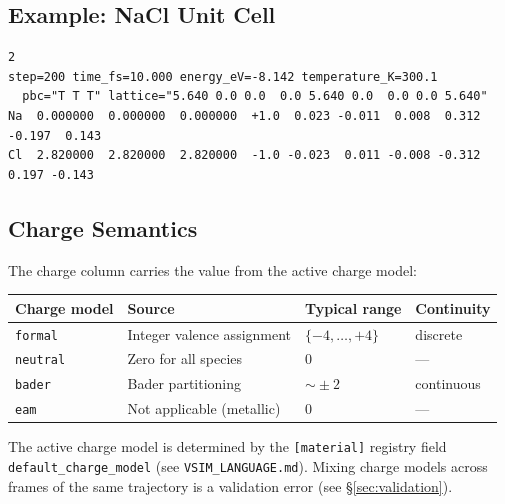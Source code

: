 \documentclass[11pt, a4paper, oneside]{article}
\begin{document}
\subsection{Example: NaCl Unit Cell}
\label{sec:xyza_example}

\begin{lstlisting}[caption={Two-ion NaCl unit at 300\,K (\texttt{.xyza}).}]
2
step=200 time_fs=10.000 energy_eV=-8.142 temperature_K=300.1
  pbc="T T T" lattice="5.640 0.0 0.0  0.0 5.640 0.0  0.0 0.0 5.640"
Na  0.000000  0.000000  0.000000  +1.0  0.023 -0.011  0.008  0.312 -0.197  0.143
Cl  2.820000  2.820000  2.820000  -1.0 -0.023  0.011 -0.008 -0.312  0.197 -0.143
\end{lstlisting}

\subsection{Charge Semantics}
\label{sec:xyza_charge}

The charge column carries the value from the active charge model:

\begin{center}
\begin{tabular}{llll}
  \toprule
  Charge model & Source & Typical range & Continuity \\
  \midrule
  \texttt{formal}  & Integer valence assignment     & $\{-4,\ldots,+4\}$ & discrete \\
  \texttt{neutral} & Zero for all species           & $0$                & --- \\
  \texttt{bader}   & Bader partitioning             & $\sim\!\pm 2$      & continuous \\
  \texttt{eam}     & Not applicable (metallic)      & $0$                & --- \\
  \bottomrule
\end{tabular}
\end{center}

The active charge model is determined by the \texttt{[material]} registry
field \texttt{default\_charge\_model} (see \texttt{VSIM\_LANGUAGE.md}).
Mixing charge models across frames of the same trajectory is a validation
error (see \S\ref{sec:validation}).
\end{document}
